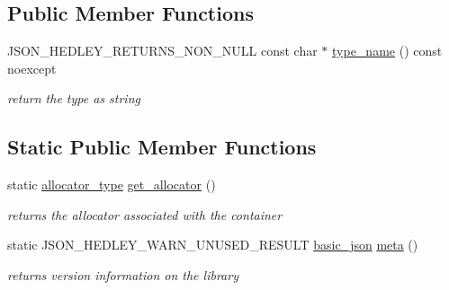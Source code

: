 \subsection*{Public Member Functions}
\begin{DoxyCompactItemize}
\item 
J\+S\+O\+N\+\_\+\+H\+E\+D\+L\+E\+Y\+\_\+\+R\+E\+T\+U\+R\+N\+S\+\_\+\+N\+O\+N\+\_\+\+N\+U\+LL const char $\ast$ \hyperlink{classnlohmann_1_1basic__json_a459dbfcd47bd632ca82ca8ff8db278c8}{type\+\_\+name} () const noexcept
\begin{DoxyCompactList}\small\item\em return the type as string \end{DoxyCompactList}\end{DoxyCompactItemize}
\subsection*{Static Public Member Functions}
\begin{DoxyCompactItemize}
\item 
static \hyperlink{classnlohmann_1_1basic__json_ad38ae80f1e99d4b1f33c99fea4611457}{allocator\+\_\+type} \hyperlink{classnlohmann_1_1basic__json_afc55e7dca1a243b0d5011564824c0267}{get\+\_\+allocator} ()
\begin{DoxyCompactList}\small\item\em returns the allocator associated with the container \end{DoxyCompactList}\item 
static J\+S\+O\+N\+\_\+\+H\+E\+D\+L\+E\+Y\+\_\+\+W\+A\+R\+N\+\_\+\+U\+N\+U\+S\+E\+D\+\_\+\+R\+E\+S\+U\+LT \hyperlink{classnlohmann_1_1basic__json}{basic\+\_\+json} \hyperlink{classnlohmann_1_1basic__json_a351b4f65014f6c2b8b2832847d44bbd7}{meta} ()
\begin{DoxyCompactList}\small\item\em returns version information on the library \end{DoxyCompactList}\end{DoxyCompactItemize}
